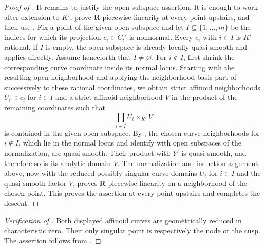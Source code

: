 \begin{proof}[Proof of ]
It remains to justify the open-subspace assertion.  It is enough to work
after extension to \(K'\), prove \(\mathbf R\)-piecewise linearity at
every point upstairs, and then use
\cite[Corollary~5.12]{GJR26}.  Fix a point of the given open subspace and
let \(I\subseteq\{1,\ldots,m\}\) be the indices for which its projection
\(c_i\in C_i'\) is nonnormal.  Every \(c_i\) with \(i\in I\) is
\(K'\)-rational.  If \(I\) is empty, the open subspace is already locally
quasi-smooth and  applies directly.
Assume henceforth that \(I\ne\varnothing\).  For \(i\notin I\), first
shrink the corresponding curve coordinate inside its normal locus.
Starting with the resulting open neighborhood and applying
the neighborhood-basis part of
 successively to these rational
coordinates, we obtain strict affinoid neighborhoods \(U_i\ni c_i\) for
\(i\in I\) and a strict affinoid neighborhood \(V\) in the product of
the remaining coordinates such that
\[
                       \prod_{i\in I}U_i\times_{K'}V
\]
is contained in the given open subspace.  By
\cite[Lemma~3.9(1)]{GR25Classical}, the chosen curve neighborhoods for
\(i\notin I\), which lie in the normal locus and identify with open
subspaces of the normalization, are quasi-smooth.  Their product with
\(Y'\) is quasi-smooth, and therefore so is its analytic domain \(V\).
The normalization-and-induction argument above, now with the reduced
possibly singular curve domains \(U_i\) for \(i\in I\) and the
quasi-smooth factor \(V\), proves \(\mathbf R\)-piecewise linearity on a
neighborhood of the chosen point.  This proves the assertion at every
point upstairs and completes the descent.
\end{proof}

\begin{proof}[Verification of ]
Both displayed affinoid curves are geometrically reduced in
characteristic zero.  Their only singular point is respectively the node
or the cusp.  The assertion follows from
.
\end{proof}
